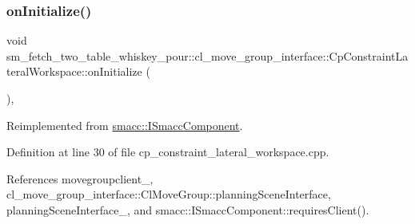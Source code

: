 \subsubsection{\texorpdfstring{on\+Initialize()}{onInitialize()}}
{\footnotesize\ttfamily void sm\+\_\+fetch\+\_\+two\+\_\+table\+\_\+whiskey\+\_\+pour\+::cl\+\_\+move\+\_\+group\+\_\+interface\+::\+Cp\+Constraint\+Lateral\+Workspace\+::on\+Initialize (\begin{DoxyParamCaption}{ }\end{DoxyParamCaption})\hspace{0.3cm}{\ttfamily [override]}, {\ttfamily [virtual]}}



Reimplemented from \hyperlink{classsmacc_1_1ISmaccComponent_ae6f71d008db12553912e9436184b9e65}{smacc\+::\+I\+Smacc\+Component}.



Definition at line 30 of file cp\+\_\+constraint\+\_\+lateral\+\_\+workspace.\+cpp.



References movegroupclient\+\_\+, cl\+\_\+move\+\_\+group\+\_\+interface\+::\+Cl\+Move\+Group\+::planning\+Scene\+Interface, planning\+Scene\+Interface\+\_\+, and smacc\+::\+I\+Smacc\+Component\+::requires\+Client().


